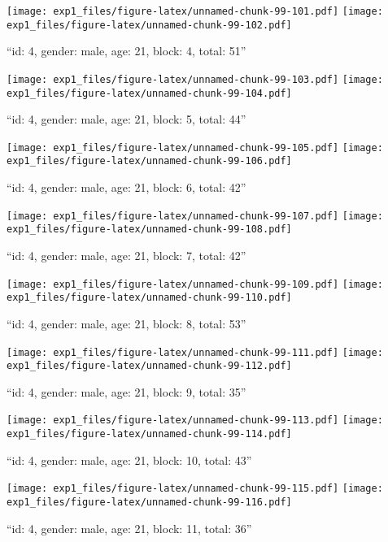 \documentclass[,]{article}
\begin{document}
\texttt{[image: exp1\_files/figure-latex/unnamed-chunk-99-101.pdf]}
\texttt{[image: exp1\_files/figure-latex/unnamed-chunk-99-102.pdf]}

\newpage
[1] 

``id: 4, gender: male, age: 21, block: 4, total: 51''

\texttt{[image: exp1\_files/figure-latex/unnamed-chunk-99-103.pdf]}
\texttt{[image: exp1\_files/figure-latex/unnamed-chunk-99-104.pdf]}

\newpage
[1] 

``id: 4, gender: male, age: 21, block: 5, total: 44''

\texttt{[image: exp1\_files/figure-latex/unnamed-chunk-99-105.pdf]}
\texttt{[image: exp1\_files/figure-latex/unnamed-chunk-99-106.pdf]}

\newpage
[1] 

``id: 4, gender: male, age: 21, block: 6, total: 42''

\texttt{[image: exp1\_files/figure-latex/unnamed-chunk-99-107.pdf]}
\texttt{[image: exp1\_files/figure-latex/unnamed-chunk-99-108.pdf]}

\newpage
[1] 

``id: 4, gender: male, age: 21, block: 7, total: 42''

\texttt{[image: exp1\_files/figure-latex/unnamed-chunk-99-109.pdf]}
\texttt{[image: exp1\_files/figure-latex/unnamed-chunk-99-110.pdf]}

\newpage
[1] 

``id: 4, gender: male, age: 21, block: 8, total: 53''

\texttt{[image: exp1\_files/figure-latex/unnamed-chunk-99-111.pdf]}
\texttt{[image: exp1\_files/figure-latex/unnamed-chunk-99-112.pdf]}

\newpage
[1] 

``id: 4, gender: male, age: 21, block: 9, total: 35''

\texttt{[image: exp1\_files/figure-latex/unnamed-chunk-99-113.pdf]}
\texttt{[image: exp1\_files/figure-latex/unnamed-chunk-99-114.pdf]}

\newpage
[1] 

``id: 4, gender: male, age: 21, block: 10, total: 43''

\texttt{[image: exp1\_files/figure-latex/unnamed-chunk-99-115.pdf]}
\texttt{[image: exp1\_files/figure-latex/unnamed-chunk-99-116.pdf]}

\newpage
[1] 

``id: 4, gender: male, age: 21, block: 11, total: 36''
\end{document}

